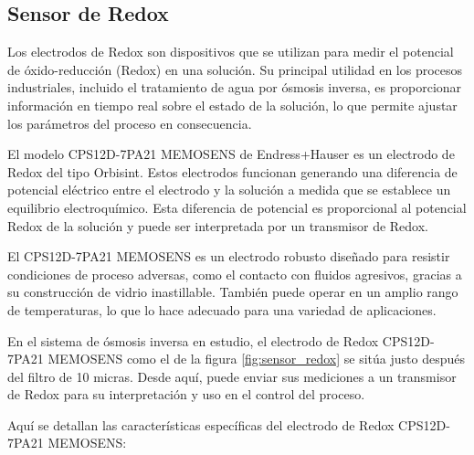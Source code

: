 \subsection{Sensor de Redox} \label{sec:sensor_redox}

Los electrodos de Redox son dispositivos que se utilizan para medir el potencial de óxido-reducción (Redox) en una
solución. Su principal utilidad en los procesos industriales, incluido el tratamiento de agua por ósmosis inversa,
es proporcionar información en tiempo real sobre el estado de la solución, lo que permite ajustar los parámetros
del proceso en consecuencia.

El modelo CPS12D-7PA21 MEMOSENS de Endress+Hauser es un electrodo de Redox del tipo Orbisint. Estos electrodos
funcionan generando una diferencia de potencial eléctrico entre el electrodo y la solución a medida que se establece
un equilibrio electroquímico. Esta diferencia de potencial es proporcional al potencial Redox de la solución y puede
ser interpretada por un transmisor de Redox.

El CPS12D-7PA21 MEMOSENS es un electrodo robusto diseñado para resistir condiciones de proceso adversas, como el
contacto con fluidos agresivos, gracias a su construcción de vidrio inastillable. También puede operar en un amplio
rango de temperaturas, lo que lo hace adecuado para una variedad de aplicaciones.

En el sistema de ósmosis inversa en estudio, el electrodo de Redox CPS12D-7PA21 MEMOSENS como el de la figura \ref{fig:sensor_redox}
se sitúa justo después del filtro de 10 micras. Desde aquí, puede enviar sus mediciones a un transmisor de
Redox para su interpretación y uso en el control del proceso.



Aquí se detallan las características específicas del electrodo de Redox CPS12D-7PA21 MEMOSENS:\\

